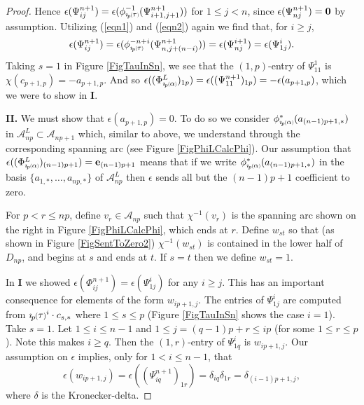 \documentclass[11pt]{amsart}
\def\A{{\mathcal A}}
\newcommand*{\smallp}[1]{\scalebox{.75}{\ensuremath#1}}
\newcommand*{\subsmallp}[1]{\scalebox{.5}{\ensuremath#1}}
\newcommand{\pp}[2][p]{\imath_{\hspace*{-1pt}#1}\hspace*{-.5pt}\smallp(#2\smallp)}
\newcommand{\subpp}[2][p]{\imath_{\hspace*{-1pt}#1}\hspace*{-.5pt}\subsmallp(#2\subsmallp)}
\theoremstyle{definition}
\begin{document}
\begin{proof}
Hence $\epsilon(\Psi_{ij}^{n+1})=\epsilon(\phi_{\subpp\tau}^{-1}(\Psi_{i+1,j+1}^{n+1}))$ for $1\le j < n$, since $\epsilon(\Psi_{nj}^{n+1})={\bf 0}$ by assumption. Utilizing (\ref{eqn1}) and (\ref{eqn2}) again we find that, for $i\ge j$,
    \[\epsilon(\Psi_{ij}^{n+1}) = \epsilon(\phi_{\subpp\tau}^{-n+i}(\Psi_{n,j+(n-i)}^{n+1})) = \epsilon(\Psi_{nj}^{i+1}) = \epsilon(\Psi_{1j}^i).\]
Taking $s=1$ in Figure \ref{FigTauInSn}, we see that the $(1,p)$-entry of $\Psi_{11}^1$ is $\chi(c_{p+1,p})=-a_{p+1,p}$. And so $\epsilon((\Phi_{\subpp\alpha}^L)_{1p}) = \epsilon((\Psi^{n+1}_{11})_{1p}) = -\epsilon(a_{p+1,p})$, which we were to show in {\bf I}.

{\bf II.} We must show that $\epsilon(a_{p+1,p})=0$. To do so we consider $\phi^\ast_{\subpp\alpha}(a_{(n-1)p+1,\ast})$ in $\A_{np}^L\subset\A_{np+1}$ which, similar to above, we understand through the corresponding spanning arc (see Figure \ref{FigPhiLCalcPhi}). Our assumption that $\epsilon((\Phi_{\subpp\alpha}^L)_{(n-1)p+1})={\bf e}_{(n-1)p+1}$ means that if we write $\phi^\ast_{\subpp\alpha}(a_{(n-1)p+1,\ast})$ in the basis $\{a_{1,\ast},\ldots,a_{np,\ast}\}$ of $\A_{np}^L$ then $\epsilon$ sends all but the $(n-1)p+1$ coefficient to zero. 

For $p< r \le np$, define $v_r\in\A_{np}$ such that $\chi^{-1}(v_r)$ is the spanning arc shown on the right in Figure \ref{FigPhiLCalcPhi}, which ends at $r$. Define $w_{st}$ so that (as shown in Figure \ref{FigSentToZero2}) $\chi^{-1}(w_{st})$ is contained in the lower half of $D_{np}$, and begins at $s$ and ends at $t$. If $s=t$ then we define $w_{st}=1$.

In {\bf I} we showed $\epsilon(\Phi_{ij}^{n+1}) = \epsilon(\Psi_{1j}^i)$ for any $i\ge j$. This has an important consequence for elements of the form $w_{ip+1,j}$. The entries of $\Psi_{1j}^i$ are computed from $\pp\tau^i\cdot c_{s,\ast}$ where $1\le s\le p$ (Figure \ref{FigTauInSn} shows the case $i=1$). Take $s=1$. Let $1\le i\le n-1$ and $1\le j=(q-1)p+r\le ip$ (for some $1\le r\le p$). Note this makes $i\ge q$. Then the $(1,r)$-entry of $\Psi_{1q}^i$ is $w_{ip+1,j}$. Our assumption on $\epsilon$ implies, only for $1<i\le n-1$, that
    \begin{equation}
    \epsilon(w_{ip+1,j})=\epsilon((\Psi_{iq}^{n+1})_{1r}) = \delta_{iq}\delta_{1r} = \delta_{(i-1)p+1,j},
    \label{EqnMod1Ws}
    \end{equation}
where $\delta$ is the Kronecker-delta. 


\end{proof}
\end{document}
